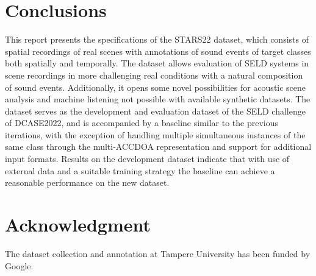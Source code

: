 \documentclass{article}
\begin{document}
\begin{sloppy}








\section{Conclusions}
\label{sec:conclusions}

This report presents the specifications of the STARS22 dataset, which consists of spatial recordings of real scenes with annotations of sound events of target classes both spatially and temporally. The dataset allows evaluation of SELD systems in scene recordings in more challenging real conditions with a natural composition of sound events. Additionally, it opens some novel possibilities for acoustic scene analysis and machine listening not possible with available synthetic datasets. The dataset serves as the development and evaluation dataset of the SELD challenge of DCASE2022, and is accompanied by a baseline similar to the previous iterations, with the exception of handling multiple simultaneous instances of the same class through the multi-ACCDOA representation and support for additional input formats. Results on the development dataset indicate that with use of external data and a suitable training strategy the baseline can achieve a reasonable performance on the new dataset.

\section{Acknowledgment}
\label{sec:acknowledgment}

The dataset collection and annotation at Tampere University has been funded by Google.







\end{sloppy}
\end{document}
